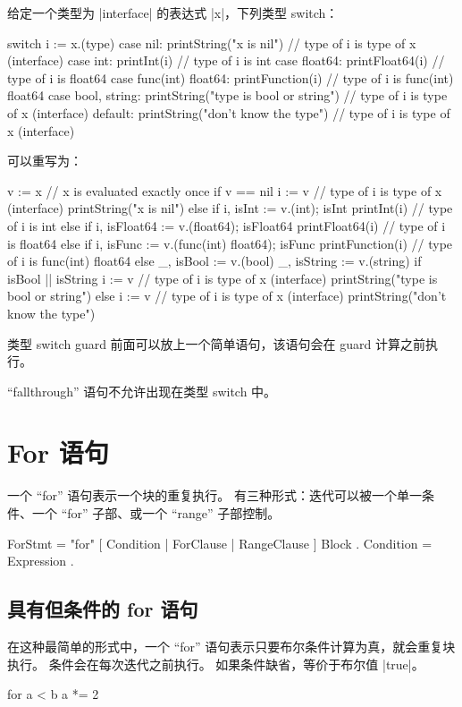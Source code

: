 给定一个类型为 \code|interface{}| 的表达式 \code|x|，下列类型 switch：
\begin{golang}
switch i := x.(type) {
case nil:
	printString("x is nil")                // type of i is type of x (interface{})
case int:
	printInt(i)                            // type of i is int
case float64:
	printFloat64(i)                        // type of i is float64
case func(int) float64:
	printFunction(i)                       // type of i is func(int) float64
case bool, string:
	printString("type is bool or string")  // type of i is type of x (interface{})
default:
	printString("don't know the type")     // type of i is type of x (interface{})
}
\end{golang}
可以重写为：
\begin{golang}
v := x  // x is evaluated exactly once
if v == nil {
	i := v                                 // type of i is type of x (interface{})
	printString("x is nil")
} else if i, isInt := v.(int); isInt {
	printInt(i)                            // type of i is int
} else if i, isFloat64 := v.(float64); isFloat64 {
	printFloat64(i)                        // type of i is float64
} else if i, isFunc := v.(func(int) float64); isFunc {
	printFunction(i)                       // type of i is func(int) float64
} else {
	_, isBool := v.(bool)
	_, isString := v.(string)
	if isBool || isString {
		i := v                         // type of i is type of x (interface{})
		printString("type is bool or string")
	} else {
		i := v                         // type of i is type of x (interface{})
		printString("don't know the type")
	}
}
\end{golang}

类型 switch guard 前面可以放上一个简单语句，该语句会在 guard 计算之前执行。

``fallthrough'' 语句不允许出现在类型 switch 中。

\section{For 语句}
一个 ``for'' 语句表示一个块的重复执行。
有三种形式：迭代可以被一个单一条件、一个 ``for'' 子部、或一个 ``range'' 子部控制。
\begin{EBNF}
ForStmt = "for" [ Condition | ForClause | RangeClause ] Block .
Condition = Expression .
\end{EBNF}

\subsection{具有但条件的 for 语句}
在这种最简单的形式中，一个 ``for'' 语句表示只要布尔条件计算为真，就会重复块执行。
条件会在每次迭代之前执行。
如果条件缺省，等价于布尔值 \code|true|。
\begin{golang}
for a < b {
	a *= 2
}
\end{golang}

